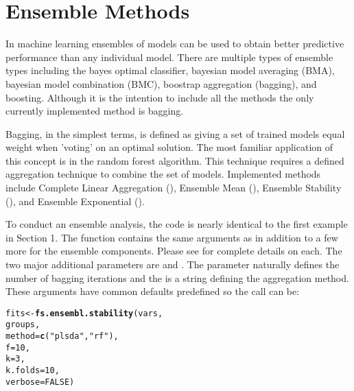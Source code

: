 \documentclass[12pt]{article}\usepackage[]{graphicx}\usepackage[usenames,dvipsnames]{color}
\makeatletter
\newcommand{\hlnum}[1]{\textcolor[rgb]{0.686,0.059,0.569}{#1}}%
\newcommand{\hlstr}[1]{\textcolor[rgb]{0.192,0.494,0.8}{#1}}%
\newcommand{\hlstd}[1]{\textcolor[rgb]{0.345,0.345,0.345}{#1}}%
\newcommand{\hlkwb}[1]{\textcolor[rgb]{0.69,0.353,0.396}{#1}}%
\newcommand{\hlkwc}[1]{\textcolor[rgb]{0.333,0.667,0.333}{#1}}%
\newcommand{\hlkwd}[1]{\textcolor[rgb]{0.737,0.353,0.396}{\textbf{#1}}}%
\newenvironment{kframe}{%
 \def\at@end@of@kframe{}%
 \ifinner\ifhmode%
  \def\at@end@of@kframe{\end{minipage}}%
  \begin{minipage}{\columnwidth}%
 \fi\fi%
 \def\FrameCommand##1{\hskip\@totalleftmargin \hskip-\fboxsep
 \colorbox{shadecolor}{##1}\hskip-\fboxsep
     \hskip-\linewidth \hskip-\@totalleftmargin \hskip\columnwidth}%
 \MakeFramed {\advance\hsize-\width
   \@totalleftmargin\z@ \linewidth\hsize
   \@setminipage}}%
 {\par\unskip\endMakeFramed%
 \at@end@of@kframe}
\newenvironment{knitrout}{}{} %
\makeatother
\begin{document}
\newpage
\maketitle
\section{Ensemble Methods}

In machine learning ensembles of models can be used to obtain better predictive
performance than any individual model.  There are multiple types of ensemble
types including the bayes optimal classifier, bayesian model averaging (BMA),
bayesian model combination (BMC), boostrap aggregation (bagging), and boosting. 
Although it is the intention to include all the methods the only currently
implemented method is bagging.

Bagging, in the simplest terms, is defined as giving a set of trained models
equal weight when 'voting' on an optimal solution.  The most familiar 
application of this concept is in the random forest algorithm.  This technique
requires a defined aggregation technique to combine the set of models.  
Implemented methods include Complete Linear Aggregation (), 
Ensemble Mean (), Ensemble Stability (), and
Ensemble Exponential ().

To conduct an ensemble analysis, the code is nearly identical to the first
example in Section 1.  The  function contains
the same arguments as  in addition to a few more for
the ensemble components.  Please see  for
complete details on each.  The two major additional parameters are 
 and .  The  parameter
naturally defines the number of bagging iterations and the 
 is a string defining the aggregation method.  These
arguments have common defaults predefined so the call can be:

\begin{knitrout}
\color{fgcolor}\begin{kframe}
\begin{alltt}
\hlstd{fits} \hlkwb{<-} \hlkwd{fs.ensembl.stability}\hlstd{(vars,}
                            \hlstd{groups,}
                            \hlkwc{method} \hlstd{=} \hlkwd{c}\hlstd{(}\hlstr{"plsda"}\hlstd{,} \hlstr{"rf"}\hlstd{),}
                            \hlkwc{f} \hlstd{=} \hlnum{10}\hlstd{,}
                            \hlkwc{k} \hlstd{=} \hlnum{3}\hlstd{,}
                            \hlkwc{k.folds} \hlstd{=} \hlnum{10}\hlstd{,}
                            \hlkwc{verbose} \hlstd{=} \hlnum{FALSE}\hlstd{)}
\end{alltt}
\end{kframe}
\end{knitrout}
\end{document}

